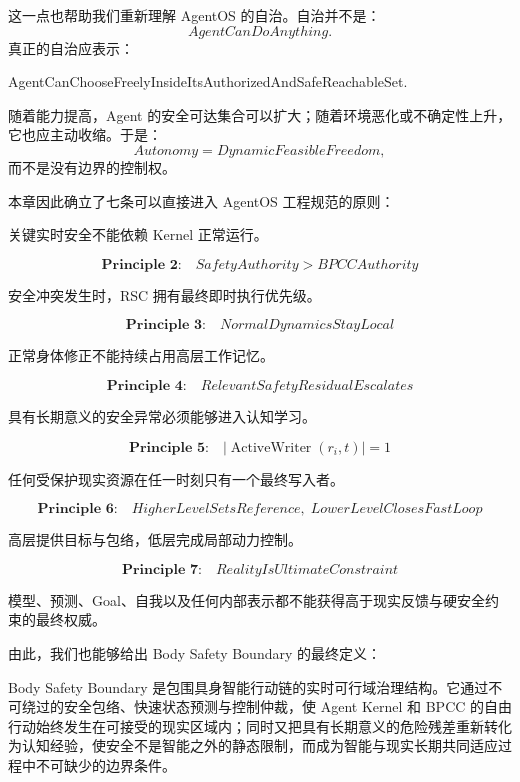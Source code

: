 这一点也帮助我们重新理解 AgentOS 的自治。自治并不是：
\[
AgentCanDoAnything.
\]
真正的自治应表示：
\begin{statementbox}
AgentCanChooseFreelyInsideItsAuthorizedAndSafeReachableSet.
\end{statementbox}
随着能力提高，Agent 的安全可达集合可以扩大；随着环境恶化或不确定性上升，它也应主动收缩。于是：
\[
Autonomy
=
DynamicFeasibleFreedom,
\]
而不是没有边界的控制权。

本章因此确立了七条可以直接进入 AgentOS 工程规范的原则：

\begin{statementbox}
\centering
{}
\end{statementbox}

关键实时安全不能依赖 Kernel 正常运行。

\[
\boxed{
\textbf{Principle 2:}\quad
SafetyAuthority>BPCCAuthority
}
\]

安全冲突发生时，RSC 拥有最终即时执行优先级。

\[
\boxed{
\textbf{Principle 3:}\quad
NormalDynamicsStayLocal
}
\]

正常身体修正不能持续占用高层工作记忆。

\[
\boxed{
\textbf{Principle 4:}\quad
RelevantSafetyResidualEscalates
}
\]

具有长期意义的安全异常必须能够进入认知学习。

\[
\boxed{
\textbf{Principle 5:}\quad
|\operatorname{ActiveWriter}(r_i,t)|=1
}
\]

任何受保护现实资源在任一时刻只有一个最终写入者。

\[
\boxed{
\textbf{Principle 6:}\quad
HigherLevelSetsReference,\;
LowerLevelClosesFastLoop
}
\]

高层提供目标与包络，低层完成局部动力控制。

\[
\boxed{
\textbf{Principle 7:}\quad
RealityIsUltimateConstraint
}
\]

模型、预测、Goal、自我以及任何内部表示都不能获得高于现实反馈与硬安全约束的最终权威。

由此，我们也能够给出 Body Safety Boundary 的最终定义：

\begin{definition*}
Body Safety Boundary 是包围具身智能行动链的实时可行域治理结构。它通过不可绕过的安全包络、快速状态预测与控制仲裁，使 Agent Kernel 和 BPCC 的自由行动始终发生在可接受的现实区域内；同时又把具有长期意义的危险残差重新转化为认知经验，使安全不是智能之外的静态限制，而成为智能与现实长期共同适应过程中不可缺少的边界条件。
\end{definition*}

